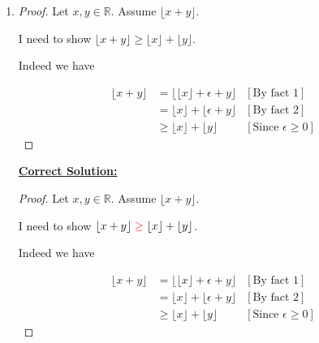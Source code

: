 \documentclass[12pt]{article}
\begin{document}
\begin{enumerate}[1.]
    \item
    \setcounter{equation}{0}
    \begin{proof}

    Let $x,y \in \mathbb{R}$. Assume $\lfloor x + y \rfloor$.

    \bigskip

    I need to show $\lfloor x + y \rfloor \geq \lfloor x \rfloor + \lfloor y \rfloor$.

    \bigskip

    Indeed we have

    \begin{align}
        \lfloor x + y \rfloor &= \lfloor \lfloor x \rfloor + \epsilon + y \rfloor & [\text{By fact 1}]\\
        &= \lfloor x \rfloor + \lfloor \epsilon + y \rfloor & [\text{By fact 2}]\\
        &\geq \lfloor x \rfloor + \lfloor y \rfloor & [\text{Since $\epsilon \geq 0$}]
    \end{align}
    \end{proof}

    \bigskip

    \begin{mdframed}
        \underline{\textbf{Correct Solution:}}
        \setcounter{equation}{0}
        \begin{proof}

        \bigskip

        Let $x,y \in \mathbb{R}$. Assume $\lfloor x + y \rfloor$.

        \bigskip

        I need to show $\lfloor x + y \rfloor \color{red}\geq\color{black} \lfloor x \rfloor + \lfloor y \rfloor$.

        \bigskip

        Indeed we have

        \begin{align}
            \lfloor x + y \rfloor &= \lfloor \lfloor x \rfloor + \epsilon + y \rfloor & [\text{By fact 1}]\\
            &= \lfloor x \rfloor + \lfloor \epsilon + y \rfloor & [\text{By fact 2}]\\
            &\geq \lfloor x \rfloor + \lfloor y \rfloor & [\text{Since $\epsilon \geq 0$}]
        \end{align}
        \end{proof}
    \end{mdframed}
\end{enumerate}
\end{document}

